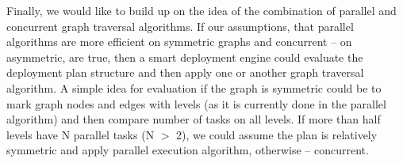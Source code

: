 \noindent Finally, we would like to build up on the idea of the combination of parallel and concurrent graph traversal algorithms. If our assumptions, that parallel algorithms are more efficient on symmetric graphs and concurrent -- on asymmetric, are true, then a smart deployment engine could evaluate the deployment plan structure and then apply one or another graph traversal algorithm. A simple idea for evaluation if the graph is symmetric could be to mark graph nodes and edges with levels (as it is currently done in the parallel algorithm) and then compare number of tasks on all levels. If more than half levels have N parallel tasks (N $>$ 2), we could assume the plan is relatively symmetric and apply parallel execution algorithm, otherwise -- concurrent.

